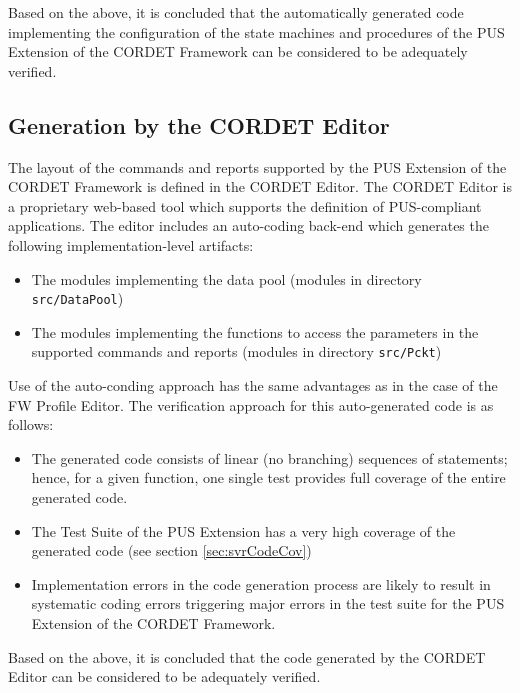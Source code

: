 \documentclass{pnp_article}
\begin{document}
Based on the above, it is concluded that the automatically generated code implementing the configuration of the state machines and procedures of the PUS Extension of the CORDET Framework can be considered to be adequately verified.

\subsection{Generation by the CORDET Editor}
The layout of the commands and reports supported by the PUS Extension of the CORDET Framework is defined in the CORDET Editor. The CORDET Editor is a proprietary web-based tool which supports the definition of PUS-compliant applications. The editor includes an auto-coding back-end which generates the following implementation-level artifacts:

\begin{itemize}
\item The modules implementing the data pool (modules in directory \texttt{src/DataPool})
\item The modules implementing the functions to access the parameters in the supported commands and reports (modules in directory \texttt{src/Pckt})
\end{itemize}

Use of the auto-conding approach has the same advantages as in the case of the FW Profile Editor. The verification approach for this auto-generated code is as follows:

\begin{itemize}
\item The generated code consists of linear (no branching) sequences of statements; hence, for a given function, one single test provides full coverage of the entire generated code.
\item The Test Suite of the PUS Extension has a very high coverage of the generated code (see section \ref{sec:svrCodeCov})
\item Implementation errors in the code generation process are likely to result in systematic coding errors triggering major errors in the test suite for the PUS Extension of the CORDET Framework.
\end{itemize}

Based on the above, it is concluded that the code generated by the CORDET Editor can be considered to be adequately verified.


\end{document}

